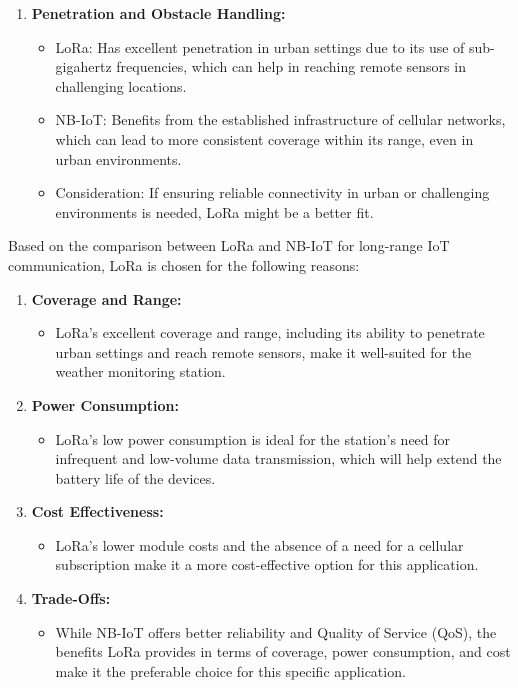 \documentclass{article}
\begin{document}
\begin{enumerate}
\begin{enumerate}
    \item \textbf{Penetration and Obstacle Handling:}
    \begin{itemize}
        \item LoRa: Has excellent penetration in urban settings due to its use of sub-gigahertz frequencies, which can help in reaching remote sensors in challenging locations.
        \item NB-IoT: Benefits from the established infrastructure of cellular networks, which can lead to more consistent coverage within its range, even in urban environments.
        \item Consideration: If ensuring reliable connectivity in urban or challenging environments is needed, LoRa might be a better fit.
    \end{itemize}
\end{enumerate}

Based on the comparison between LoRa and NB-IoT for long-range IoT communication, LoRa is chosen for the following reasons:

\begin{enumerate}
    \item \textbf{Coverage and Range:}
    \begin{itemize}
        \item LoRa's excellent coverage and range, including its ability to penetrate urban settings and reach remote sensors, make it well-suited for the weather monitoring station.
    \end{itemize}

    \item \textbf{Power Consumption:}
    \begin{itemize}
        \item LoRa's low power consumption is ideal for the station's need for infrequent and low-volume data transmission, which will help extend the battery life of the devices.
    \end{itemize}

    \item \textbf{Cost Effectiveness:}
    \begin{itemize}
        \item LoRa's lower module costs and the absence of a need for a cellular subscription make it a more cost-effective option for this application.
    \end{itemize}

    \item \textbf{Trade-Offs:}
    \begin{itemize}
        \item While NB-IoT offers better reliability and Quality of Service (QoS), the benefits LoRa provides in terms of coverage, power consumption, and cost make it the preferable choice for this specific application.
    \end{itemize}
\end{enumerate}


\end{enumerate}
\end{document}
